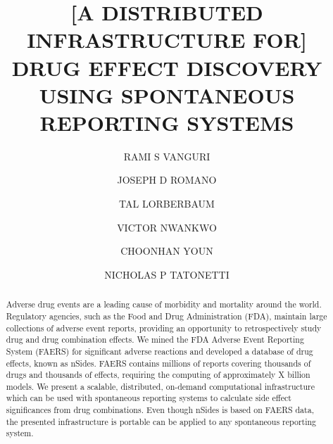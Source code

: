 \documentclass{ws-procs11x85}
\begin{document}
\title{[A DISTRIBUTED INFRASTRUCTURE FOR] DRUG EFFECT DISCOVERY USING SPONTANEOUS REPORTING SYSTEMS}

\author{RAMI S VANGURI}

\address{Department of Biomedical Informatics, Columbia University,\\
New York, NY 10032 USA\\
E-mail: r.vanguri@columbia.edu}

\author{JOSEPH D ROMANO}

\address{Department of Biomedical Informatics, Columbia University,\\
New York, NY 10032 USA\\
E-mail: jdr2160@columbia.edu}

\author{TAL LORBERBAUM}

\address{Department of Biomedical Informatics, Columbia University,\\
New York, NY 10032 USA\\
E-mail: tal.lorberbaum@columbia.edu}

\author{VICTOR NWANKWO}

\address{Department of Biomedical Informatics, Columbia University,\\
New York, NY 10032 USA\\
E-mail: vtn2106@columbia.edu}

\author{CHOONHAN YOUN}

\address{San Diego Supercomputer Center, University of California, San Diego,\\
La Jolla, CA 92093 USA\\
E-mail: cyoun@sdsc.edu}

\author{NICHOLAS P TATONETTI}

\address{Department of Biomedical Informatics, Columbia University,\\
New York, NY 10032 USA\\
E-mail: nick.tatonetti@columbia.edu}

\begin{abstract}
Adverse drug events are a leading cause of morbidity and mortality
around the world. Regulatory agencies, such as the Food and Drug
Administration (FDA), maintain large collections of adverse event
reports, providing an opportunity to retrospectively study drug and
drug combination effects.  We mined the FDA Adverse Event Reporting
System (FAERS) for significant adverse reactions and developed a
database of drug effects, known as nSides. FAERS contains millions of
reports covering thousands of drugs and thousands of effects,
requiring the computing of approximately X billion models. We present
a scalable, distributed, on-demand computational infrastructure which
can be used with spontaneous reporting systems to calculate side
effect significances from drug combinations. Even though nSides is
based on FAERS data, the presented infrastructure is portable can be
applied to any spontaneous reporting system.
\end{abstract}
\end{document}

